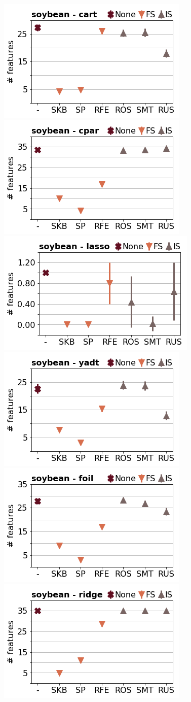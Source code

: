 \documentclass[runningheads,a4paper]{llncs}
\begin{document}
\begin{figure}[!h]
\includegraphics[width=0.32\linewidth]{fig/preps_soybean_DT_sklearn_nbr_features.png}
\includegraphics[width=0.32\linewidth]{fig/preps_soybean_RB_cpar_nbr_features.png}
\includegraphics[width=0.32\linewidth]{fig/preps_soybean_LM_lasso_nbr_features.png}
\includegraphics[width=0.32\linewidth]{fig/preps_soybean_DT_yadt_nbr_features.png}
\includegraphics[width=0.32\linewidth]{fig/preps_soybean_RB_foil_nbr_features.png}
\includegraphics[width=0.32\linewidth]{fig/preps_soybean_LM_ridge_nbr_features.png}
\end{figure}
\end{document}
